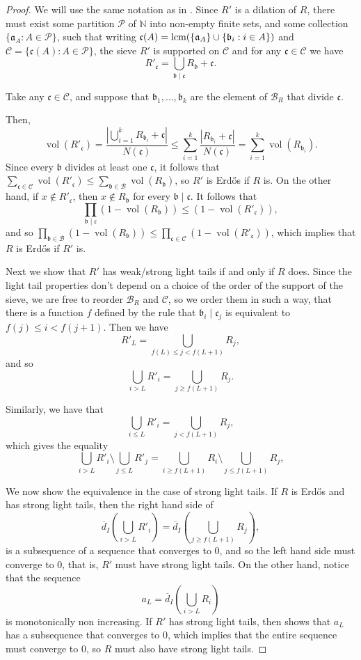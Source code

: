 \documentclass[a4paper,11pt,reqno]{amsart}
\theoremstyle{plain}
\theoremstyle{remark}
\DeclareMathOperator{\vol}{vol}
\newcommand{\cb}{\mathcal{B}}
\newcommand{\cp}{\mathcal{P}}
\newcommand{\ga}{\mathfrak{a}}
\newcommand{\gb}{\mathfrak{b}}
\newcommand{\gc}{\mathfrak{c}}
\begin{document}
		\begin{proof}
			We will use the same notation as in . Since $R'$ is a dilation of $R$, there must exist some partition $\mathcal{P}$ of $\mathbb{N}$ into non-empty finite sets, and some collection $\{\ga_A:A \in \cp\}$, such that writing $\gc(A) = \textnormal{lcm}(\{\ga_A\}\cup\{\gb_i:i\in A\})$ and $\mathcal{C} = \{\gc(A):A \in \cp\}$, the sieve $R'$ is supported on $\mathcal{C}$ and for any $\gc \in \mathcal{C}$ we have $$R'_\gc = \bigcup_{\gb \mid \gc} R_\gb + \gc.$$
			
			Take any $\gc \in \mathcal{C}$, and suppose that $\gb_{1}, \dots, \gb_{k}$ are the element of $\cb_R$ that divide $\gc$.
			
			Then,  $$\vol(R'_\gc) = \frac{|\bigcup_{i=1}^k R_{\gb_{i}} + \gc |}{N(\gc)} \leq \sum_{i=1}^k \frac{|R_{\gb_{i}}+\gc|}{N(\gc)} =  \sum_{i=1}^k\vol(R_{\gb_i}). $$ Since every $\gb$ divides at least one $\gc$,  it follows that $\sum_{\gc \in \mathcal{C} } \vol(R'_\gc) \leq  \sum_{\gb \in \cb} \vol(R_\gb) $, so $R'$ is Erdős if $R$ is. On the other hand, if $x \not \in R'_\gc$, then $x \not \in R_\gb$ for every $\gb \mid \gc$. It follows that $$\prod_{\gb \mid \gc}(1-\vol(R_\gb)) \leq (1-\vol(R'_\gc)),$$ and so $\prod_{\gb \in \cb}(1-\vol(R_\gb)) \leq \prod_{\gc\in \mathcal{C} }(1-\vol(R'_\gc))$, which implies that $R$ is Erdős if $R'$ is.
			
			Next we show that $R'$ has weak/strong light tails if and only if $R$ does. Since the light tail properties don't depend on a choice of the order of the support of the sieve, we are free to reorder $\cb_R$ and $\mathcal{C}$, so we order them in such a way, that there is a function $f$ defined by the rule that $\gb_i \mid  \gc_j$ is equivalent to $f(j) \leq i <f(j+1)$. Then we have $$R'_L = \bigcup_{f(L) \leq  j < f(L+1)}R_j,$$ and so $$\bigcup_{i>L} R'_i = \bigcup_{j\geq f(L+1)} R_j.$$
			
			Similarly, we have that $$\bigcup_{i \leq L} R'_i = \bigcup_{j<f(L+1)} R_j,$$ which gives the equality 
			$$ \bigcup_{i>L}R'_i\setminus \bigcup_{j \leq L} R'_j  =\bigcup_{i \geq f(L+1)} R_i \setminus \bigcup_{j \leq f(L+1)} R_j   ,$$
			
		
			
			We now show the equivalence in the case of strong light tails. If $R$ is Erdős and has strong light tails, then the right hand side of 
			\begin{equation}
				\label{eq: a_l subseq}
				\overline{d}_I\left(\bigcup_{i>L}R'_i\right)  = \overline{d}_I\left(\bigcup_{j \geq f(L+1)} R_j \right)   ,
			\end{equation}
			is a subsequence of a sequence that converges to $0$, and so the left hand side must converge to $0$, that is, $R'$ must have strong light tails. On the other hand, notice that the sequence $$a_L = \overline{d}_I\left(\bigcup_{i > L} R_i \right)$$ is monotonically non increasing. If $R'$ has strong light tails, then  shows that $a_L$ has a subsequence that converges to $0$, which implies that the entire sequence must converge to $0$, so $R$ must also have strong light tails.
			

\end{proof}
\end{document}
